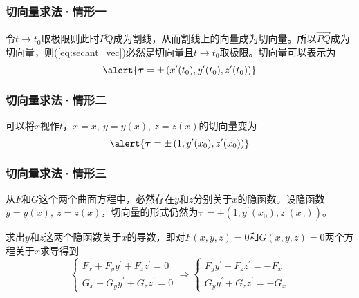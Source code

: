 \begin{frame}
    \frametitle{切向量求法·情形一}
    令$t\to t_0$取极限则此时$\overline{PQ}$成为割线，从而割线上的向量成为切向量。所以$\overrightarrow{PQ}$成为切向量，则(\ref{eq:secant_vec})必然是切向量且$t\to t_0$取极限。切向量可以表示为\pause
    \begin{equation}
        \alert{\boldsymbol{\tau} = \pm\left(x^\prime(t_0),y^\prime(t_0),z^\prime(t_0)\right)}\label{eq:tangent_vec1}
    \end{equation}

\end{frame}

\begin{frame}
    \frametitle{切向量求法·情形二}

    \begin{center}
    \end{center}\vfill\pause

    可以将$x$视作$t$，$x=x,\ y=y(x),\ z=z(x)$的切向量变为\pause
    \begin{equation}
        \alert{\boldsymbol{\tau} = \pm\left(1,y^\prime(x_0),z^\prime(x_0)\right)}\label{eq:tangent_vec2}
    \end{equation}\vfill

\end{frame}

\begin{frame}
    \frametitle{切向量求法·情形三}

    \begin{center}
    \end{center}\vfill\pause

    从$F$和$G$这个两个曲面方程中，必然存在$y$和$z$分别关于$x$的隐函数。设隐函数$y=y(x),\ z=z(x)$，切向量的形式仍然为$\boldsymbol{\tau} = \pm\left(1,y^\prime(x_0),z^\prime(x_0)\right)$。\pause

    求出$y$和$z$这两个隐函数关于$x$的导数，即对$F(x,y,z)=0$和$G(x,y,z)=0$两个方程关于$x$求导得到\pause
    \begin{equation}
        \begin{cases}
            F_x+F_yy^\prime+F_zz^\prime = 0 \\
            G_x+G_yy^\prime+G_zz^\prime = 0
        \end{cases}\Rightarrow%
        \begin{cases}
            F_yy^\prime+F_zz^\prime = -F_x \\
            G_yy^\prime+G_zz^\prime = -G_x
        \end{cases}\label{eq:hid_eq_der}
    \end{equation}\vfill

\end{frame}

